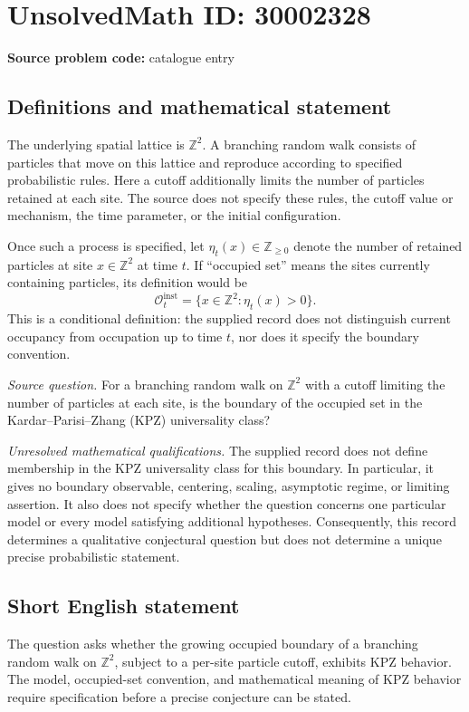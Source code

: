 \documentclass[11pt]{article}
\newcommand{\Z}{\mathbb{Z}}
\begin{document}
\section*{UnsolvedMath ID: 30002328}
\textbf{Source problem code:} catalogue entry
\subsection{Definitions and mathematical statement}
The underlying spatial lattice is \(\Z^2\). A branching random walk consists of particles that move on this lattice and reproduce according to specified probabilistic rules. Here a cutoff additionally limits the number of particles retained at each site. The source does not specify these rules, the cutoff value or mechanism, the time parameter, or the initial configuration.

Once such a process is specified, let \(\eta_t(x)\in\Z_{\geq 0}\) denote the number of retained particles at site \(x\in\Z^2\) at time \(t\). If ``occupied set'' means the sites currently containing particles, its definition would be
\[
\mathcal O_t^{\mathrm{inst}}=\{x\in\Z^2:\eta_t(x)>0\}.
\]
This is a conditional definition: the supplied record does not distinguish current occupancy from occupation up to time \(t\), nor does it specify the boundary convention.

\emph{Source question.} For a branching random walk on \(\Z^2\) with a cutoff limiting the number of particles at each site, is the boundary of the occupied set in the Kardar--Parisi--Zhang (KPZ) universality class?

\emph{Unresolved mathematical qualifications.} The supplied record does not define membership in the KPZ universality class for this boundary. In particular, it gives no boundary observable, centering, scaling, asymptotic regime, or limiting assertion. It also does not specify whether the question concerns one particular model or every model satisfying additional hypotheses. Consequently, this record determines a qualitative conjectural question but does not determine a unique precise probabilistic statement.
\subsection{Short English statement}
The question asks whether the growing occupied boundary of a branching random walk on \(\Z^2\), subject to a per-site particle cutoff, exhibits KPZ behavior. The model, occupied-set convention, and mathematical meaning of KPZ behavior require specification before a precise conjecture can be stated.
\end{document}

